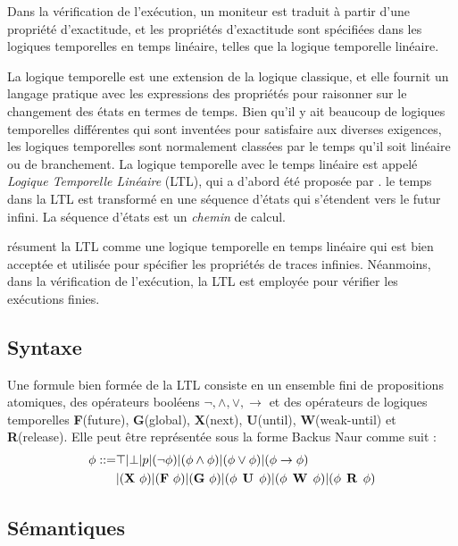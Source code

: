 Dans la vérification de l'exécution, un moniteur est traduit à partir d'une propriété d'exactitude, et les propriétés d'exactitude sont spécifiées dans les logiques temporelles en temps linéaire, telles que la logique temporelle linéaire.

La logique temporelle est une extension de la logique classique, et elle fournit un langage pratique avec les expressions des propriétés pour raisonner sur le changement des états en termes de temps. Bien qu'il y ait beaucoup de logiques temporelles différentes qui sont inventées pour satisfaire aux diverses exigences, les logiques temporelles sont normalement classées par le temps qu'il soit linéaire ou de branchement. La logique temporelle avec le temps linéaire est appelé \emph{Logique Temporelle Linéaire} (LTL), qui a d'abord été proposée par \cite{pnueli97}. le temps dans la LTL est transformé en une séquence d'états qui s'étendent vers le futur infini. La séquence d'états est un \emph{chemin} de calcul. \citep{clarke1999model,huth2004}

\cite{leucker2009brief} résument la LTL comme une logique temporelle en temps linéaire qui est bien acceptée et utilisée pour spécifier les propriétés de traces infinies. Néanmoins, dans la vérification de l'exécution, la LTL est employée pour vérifier les exécutions finies.

\subsection{Syntaxe}

Une formule bien formée de la LTL consiste en un ensemble fini de propositions atomiques, des opérateurs booléens $\neg, \wedge, \vee, \rightarrow$ et des opérateurs de logiques temporelles \textbf{F}(future), \textbf{G}(global), \textbf{X}(next), \textbf{U}(until), \textbf{W}(weak-until) et \textbf{R}(release). Elle peut être représentée sous la forme Backus Naur comme suit \citep{huth2004}:
\begin{align}
\phi ::= & \top | \bot | p | (\neg\phi) | (\phi \wedge \phi) | (\phi \vee \phi) | (\phi \rightarrow \phi) \nonumber \\
& | (\mathop{\mbox{\textbf{X}}}\, \phi) | (\mathop{\mbox{\textbf{F}}}\, \phi) | (\mathop{\mbox{\textbf{G}}}\, \phi) | (\phi \mathrel{\mbox{\,\textbf{U}}}\, \phi) | (\phi \mathrel{\mbox{\,\textbf{W}}}\, \phi) | (\phi \mathrel{\mbox{\,\textbf{R}}}\, \phi)
\end{align}

\subsection{Sémantiques}

